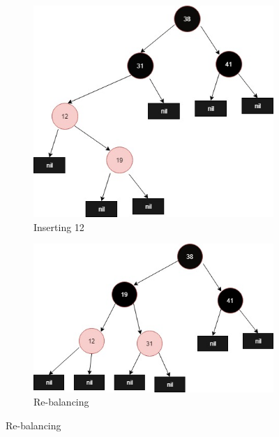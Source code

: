 \documentclass[20pt]{article} %
\begin{document}
\begin{figure}

   	\begin{subfigure}[p]{0.4\linewidth}
    	\includegraphics[width=\linewidth]{5-1.jpg}
     	\caption{Inserting 12}
   	\end{subfigure}
  	\begin{subfigure}[p]{0.4\linewidth}
    	\includegraphics[width=\linewidth]{5-2.jpg}
    	\caption{Re-balancing}
  	\end{subfigure}


\end{figure}
\end{document}
